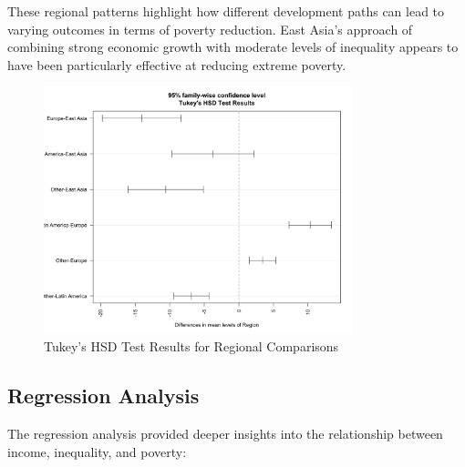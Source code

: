 \documentclass[12pt,a4paper]{article}
\begin{document}
These regional patterns highlight how different development paths can lead to varying outcomes in terms of poverty reduction. East Asia's approach of combining strong economic growth with moderate levels of inequality appears to have been particularly effective at reducing extreme poverty.

\begin{figure}[h]
\centering
\includegraphics[width=0.8\textwidth]{../output/visualizations/tukey_hsd_results.png}
\caption{Tukey's HSD Test Results for Regional Comparisons}
\end{figure}

\subsection{Regression Analysis}
The regression analysis provided deeper insights into the relationship between income, inequality, and poverty:
\end{document}
